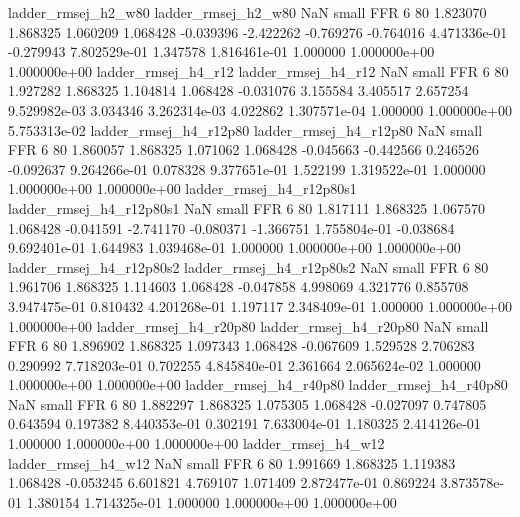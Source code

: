      ladder_rmsej_h2_w80      ladder_rmsej_h2_w80                   NaN      small      FFR                 6 80 1.823070       1.868325 1.060209       1.068428   -0.039396     -2.422262     -0.769276    -0.764016   4.471336e-01 -0.279943 7.802529e-01     1.347578   1.816461e-01            1.000000    1.000000e+00        1.000000e+00
     ladder_rmsej_h4_r12      ladder_rmsej_h4_r12                   NaN      small      FFR                 6 80 1.927282       1.868325 1.104814       1.068428   -0.031076      3.155584      3.405517     2.657254   9.529982e-03  3.034346 3.262314e-03     4.022862   1.307571e-04            1.000000    1.000000e+00        5.753313e-02
  ladder_rmsej_h4_r12p80   ladder_rmsej_h4_r12p80                   NaN      small      FFR                 6 80 1.860057       1.868325 1.071062       1.068428   -0.045663     -0.442566      0.246526    -0.092637   9.264266e-01  0.078328 9.377651e-01     1.522199   1.319522e-01            1.000000    1.000000e+00        1.000000e+00
ladder_rmsej_h4_r12p80s1 ladder_rmsej_h4_r12p80s1                   NaN      small      FFR                 6 80 1.817111       1.868325 1.067570       1.068428   -0.041591     -2.741170     -0.080371    -1.366751   1.755804e-01 -0.038684 9.692401e-01     1.644983   1.039468e-01            1.000000    1.000000e+00        1.000000e+00
ladder_rmsej_h4_r12p80s2 ladder_rmsej_h4_r12p80s2                   NaN      small      FFR                 6 80 1.961706       1.868325 1.114603       1.068428   -0.047858      4.998069      4.321776     0.855708   3.947475e-01  0.810432 4.201268e-01     1.197117   2.348409e-01            1.000000    1.000000e+00        1.000000e+00
  ladder_rmsej_h4_r20p80   ladder_rmsej_h4_r20p80                   NaN      small      FFR                 6 80 1.896902       1.868325 1.097343       1.068428   -0.067609      1.529528      2.706283     0.290992   7.718203e-01  0.702255 4.845840e-01     2.361664   2.065624e-02            1.000000    1.000000e+00        1.000000e+00
  ladder_rmsej_h4_r40p80   ladder_rmsej_h4_r40p80                   NaN      small      FFR                 6 80 1.882297       1.868325 1.075305       1.068428   -0.027097      0.747805      0.643594     0.197382   8.440353e-01  0.302191 7.633004e-01     1.180325   2.414126e-01            1.000000    1.000000e+00        1.000000e+00
     ladder_rmsej_h4_w12      ladder_rmsej_h4_w12                   NaN      small      FFR                 6 80 1.991669       1.868325 1.119383       1.068428   -0.053245      6.601821      4.769107     1.071409   2.872477e-01  0.869224 3.873578e-01     1.380154   1.714325e-01            1.000000    1.000000e+00        1.000000e+00
